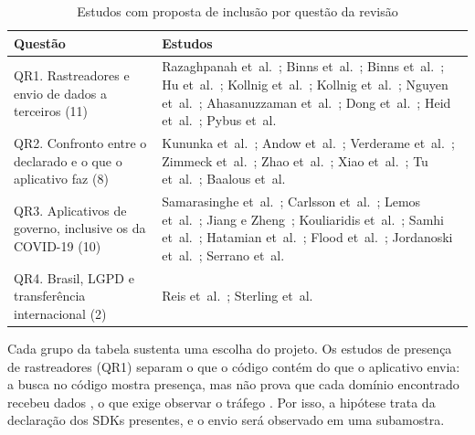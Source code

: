 \begin{table}[htbp]
\centering
\small
\caption{Estudos com proposta de inclusão por questão da revisão}\label{tab:sintese}
\begin{tabularx}{\textwidth}{|>{\raggedright\arraybackslash}p{3.6cm}|>{\raggedright\arraybackslash}X|}
\hline
\textbf{Questão} & \textbf{Estudos} \\
\hline
QR1. Rastreadores e envio de dados a terceiros (11) & Razaghpanah et~al.~\cite{razaghpanah2018}; Binns et~al.~\cite{binns2018b}; Binns et~al.~\cite{binns2018}; Hu et~al.~\cite{hu2019}; Kollnig et~al.~\cite{kollnig2021fait}; Kollnig et~al.~\cite{kollnig2021before}; Nguyen et~al.~\cite{nguyen2022}; Ahasanuzzaman et~al.~\cite{ahasanuzzaman2022}; Dong et~al.~\cite{dong2024}; Heid et~al.~\cite{heid2026}; Pybus et~al.~\cite{pybus2026} \\ \hline
QR2. Confronto entre o declarado e o que o aplicativo faz (8) & Kununka et~al.~\cite{kununka2018}; Andow et~al.~\cite{andow2020}; Verderame et~al.~\cite{verderame2020}; Zimmeck et~al.~\cite{zimmeck2021}; Zhao et~al.~\cite{zhao2023}; Xiao et~al.~\cite{xiao2023}; Tu et~al.~\cite{tu2024}; Baalous et~al.~\cite{baalous2025} \\ \hline
QR3. Aplicativos de governo, inclusive os da COVID-19 (10) & Samarasinghe et~al.~\cite{samarasinghe2022}; Carlsson et~al.~\cite{carlsson2022}; Lemos et~al.~\cite{lemos2022}; Jiang e Zheng~\cite{jiang2023}; Kouliaridis et~al.~\cite{kouliaridis2021}; Samhi et~al.~\cite{samhi2021}; Hatamian et~al.~\cite{hatamian2021}; Flood et~al.~\cite{flood2022}; Jordanoski et~al.~\cite{jordanoski2023}; Serrano et~al.~\cite{serrano2024} \\ \hline
QR4. Brasil, LGPD e transferência internacional (2) & Reis et~al.~\cite{reis2023}; Sterling et~al.~\cite{sterling2024} \\ \hline
\end{tabularx}
\end{table}

Cada grupo da tabela sustenta uma escolha do projeto. Os estudos de presença de rastreadores (QR1) separam o que o código contém do que o aplicativo envia: a busca no código mostra presença, mas não prova que cada domínio encontrado recebeu dados \cite{binns2018,kollnig2021before}, o que exige observar o tráfego \cite{razaghpanah2018,kollnig2021fait,nguyen2022}. Por isso, a hipótese trata da declaração dos SDKs presentes, e o envio será observado em uma subamostra.

